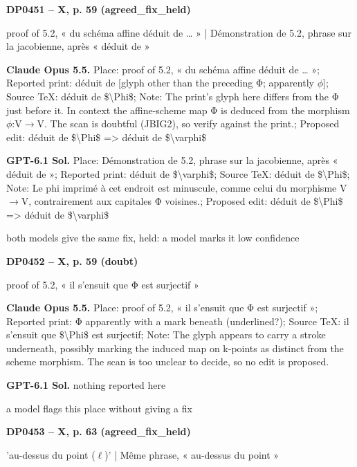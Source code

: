 \par\noindent\hypertarget{DP0451}{}\textbf{DP0451 -- X, p. 59 (agreed\_fix\_held)}\par
proof of 5.2, « du schéma affine déduit de … » | Démonstration de 5.2, phrase sur la jacobienne, après « déduit de »\par
\textbf{Claude Opus 5.5.} Place: proof of 5.2, « du schéma affine déduit de … »; Reported print: déduit de [glyph other than the preceding Φ; apparently \ensuremath{\phi}]; Source TeX: déduit de \$\textbackslash{}Phi\$; Note: The print's glyph here differs from the Φ just before it. In context the affine-scheme map Φ is deduced from the morphism \ensuremath{\phi}:V\ensuremath{\to}V. The scan is doubtful (JBIG2), so verify against the print.; Proposed edit: déduit de \$\textbackslash{}Phi\$ =\allowbreak > déduit de \$\textbackslash{}varphi\$\par
\textbf{GPT-6.1 Sol.} Place: Démonstration de 5.2, phrase sur la jacobienne, après « déduit de »; Reported print: déduit de \$\textbackslash{}varphi\$; Source TeX: déduit de \$\textbackslash{}Phi\$; Note: Le phi imprimé à cet endroit est minuscule, comme celui du morphisme V\ensuremath{\to}V, contrairement aux capitales Φ voisines.; Proposed edit: déduit de \$\textbackslash{}Phi\$ =\allowbreak > déduit de \$\textbackslash{}varphi\$\par
both models give the same fix, held: a model marks it low confidence\par
\par\noindent\hypertarget{DP0452}{}\textbf{DP0452 -- X, p. 59 (doubt)}\par
proof of 5.2, « il s'ensuit que Φ est surjectif »\par
\textbf{Claude Opus 5.5.} Place: proof of 5.2, « il s'ensuit que Φ est surjectif »; Reported print: Φ apparently with a mark beneath (underlined?); Source TeX: il s'ensuit que \$\textbackslash{}Phi\$ est surjectif; Note: The glyph appears to carry a stroke underneath, possibly marking the induced map on k-points as distinct from the scheme morphism. The scan is too unclear to decide, so no edit is proposed.\par
\textbf{GPT-6.1 Sol.} nothing reported here\par
a model flags this place without giving a fix\par
\par\noindent\hypertarget{DP0453}{}\textbf{DP0453 -- X, p. 63 (agreed\_fix\_held)}\par
'au-dessus du point (\ensuremath{\ell})' | Même phrase, « au-dessus du point »\par
